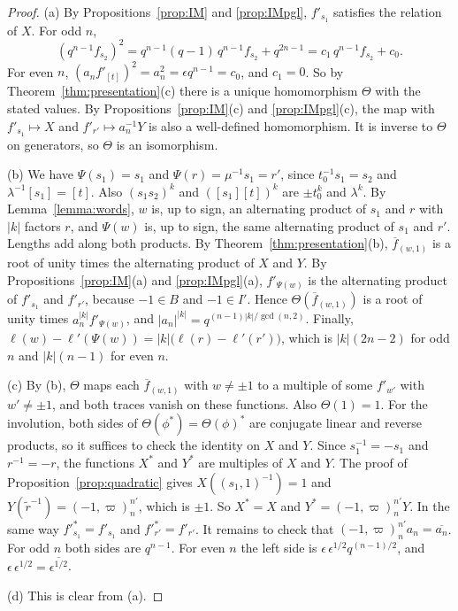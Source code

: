 \documentclass[12pt,letterpaper]{amsart}
\numberwithin{equation}{section}
\theoremstyle{definition}
\theoremstyle{remark}
\newcommand{\fbar}{\overline{f}}
\begin{document}
\begin{proof}
(a) By Propositions~\ref{prop:IM} and \ref{prop:IMpgl}, $f'_{s_1}$
satisfies the relation of $X$. For odd $n$,
\[
(q^{n-1}f_{s_2})^2=q^{n-1}(q-1)\,q^{n-1}f_{s_2}+q^{2n-1}
=c_1\,q^{n-1}f_{s_2}+c_0 .
\]
For even $n$, $(a_nf'_{[t]})^2=a_n^2=\epsilon q^{n-1}=c_0$, and
$c_1=0$. So by Theorem~\ref{thm:presentation}(c) there is a unique
homomorphism $\Theta$ with the stated values. By
Propositions~\ref{prop:IM}(c) and \ref{prop:IMpgl}(c), the map with
$f'_{s_1}\mapsto X$ and $f'_{r'}\mapsto a_n^{-1}Y$ is also a
well-defined homomorphism. It is inverse to $\Theta$ on generators, so
$\Theta$ is an isomorphism.

(b) We have $\Psi(s_1)=s_1$ and $\Psi(r)=\mu^{-1}s_1=r'$, since
$t_0^{-1}s_1=s_2$ and $\lambda^{-1}[s_1]=[t]$. Also $(s_1s_2)^k$ and
$([s_1][t])^k$ are $\pm t_0^k$ and $\lambda^k$. By
Lemma~\ref{lemma:words}, $w$ is, up to sign, an alternating product of
$s_1$ and $r$ with $|k|$ factors $r$, and $\Psi(w)$ is, up to sign, the
same alternating product of $s_1$ and $r'$. Lengths add along both
products. By Theorem~\ref{thm:presentation}(b), $\fbar_{(w,1)}$ is a
root of unity times the alternating product of $X$ and $Y$. By
Propositions~\ref{prop:IM}(a) and \ref{prop:IMpgl}(a), $f'_{\Psi(w)}$
is the alternating product of $f'_{s_1}$ and $f'_{r'}$, because $-1\in
B$ and $-1\in I'$. Hence $\Theta(\fbar_{(w,1)})$ is a root of unity
times $a_n^{|k|}f'_{\Psi(w)}$, and
$|a_n|^{|k|}=q^{(n-1)|k|/\gcd(n,2)}$. Finally,
$\ell(w)-\ell'(\Psi(w))=|k|\bigl(\ell(r)-\ell'(r')\bigr)$, which is
$|k|(2n-2)$ for odd $n$ and $|k|(n-1)$ for even $n$.

(c) By (b), $\Theta$ maps each $\fbar_{(w,1)}$ with $w\neq\pm 1$ to a
multiple of some $f'_{w'}$ with $w'\neq\pm1$, and both traces vanish
on these functions. Also $\Theta(1)=1$. For the involution, both sides
of $\Theta(\phi^*)=\Theta(\phi)^*$ are conjugate linear and reverse
products, so it suffices to check the identity on $X$ and $Y$. Since
$s_1^{-1}=-s_1$ and $r^{-1}=-r$, the functions $X^*$ and $Y^*$ are
multiples of $X$ and $Y$. The proof of Proposition~\ref{prop:quadratic}
gives $X((s_1,1)^{-1})=1$ and $Y(\tilde r^{-1})=(-1,\varpi)_n^{n'}$,
which is $\pm1$. So $X^*=X$ and $Y^*=(-1,\varpi)_n^{n'}Y$. In the same
way $f'^*_{s_1}=f'_{s_1}$ and $f'^*_{r'}=f'_{r'}$. It remains to check
that $(-1,\varpi)_n^{n'}a_n=\overline{a_n}$. For odd $n$ both sides are
$q^{n-1}$. For even $n$ the left side is $\epsilon\,\epsilon^{1/2}
q^{(n-1)/2}$, and $\epsilon\,\epsilon^{1/2}=\overline{\epsilon^{1/2}}$.

(d) This is clear from (a).
\end{proof}
\end{document}
